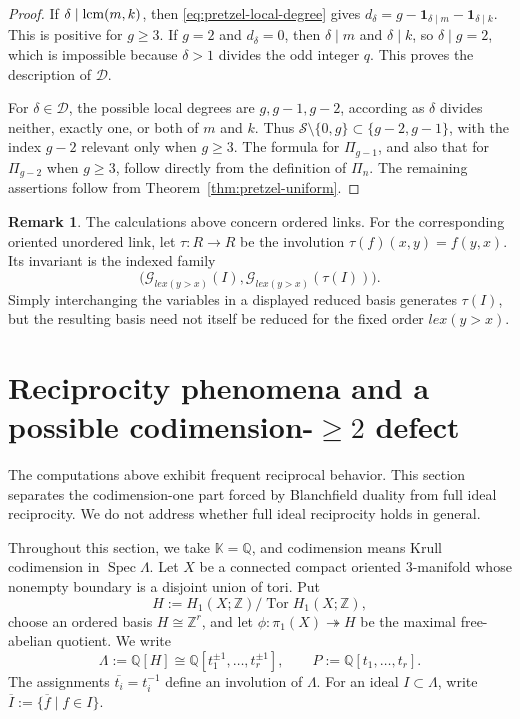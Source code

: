 \documentclass{article}
\theoremstyle{definition}
\newtheorem{remark}[definition]{Remark}
\theoremstyle{plain}
\newcommand{\Q}{{\mathbb{Q}}}
\newcommand{\lcm}{{\rm lcm}}
\newcommand{\lex}{lex}
\newcommand{\Z}{\mathbb{Z}}
\newcommand{\K}{\mathbb{K}}
\begin{document}
\begin{proof}
If \(\delta\mid\lcm(m,k)\), then
\eqref{eq:pretzel-local-degree} gives
\(d_\delta=g-\mathbf 1_{\delta\mid m}-\mathbf 1_{\delta\mid k}\).
This is positive for \(g\ge3\).  If \(g=2\) and \(d_\delta=0\), then
\(\delta\mid m\) and \(\delta\mid k\), so \(\delta\mid g=2\), which is
impossible because \(\delta>1\) divides the odd integer \(q\).  This proves
the description of \(\mathcal D\).

For \(\delta\in\mathcal D\), the possible local degrees are
\(g,g-1,g-2\), according as
\(\delta\) divides neither, exactly one, or both of \(m\) and \(k\).
Thus \(\mathcal S\setminus\{0,g\}\subset\{g-2,g-1\}\), with the
index \(g-2\) relevant only when \(g\ge3\).  The formula for
\(\Pi_{g-1}\), and also that for
\(\Pi_{g-2}\) when \(g\ge3\), follow directly from the definition of
\(\Pi_n\).  The remaining
assertions follow from Theorem~\ref{thm:pretzel-uniform}.
\end{proof}

\begin{remark}
The calculations above concern ordered links.  For the corresponding
oriented unordered link, let \(\tau\colon R\to R\) be the involution
\(\tau(f)(x,y)=f(y,x)\).  Its invariant is the indexed family
\[
\bigl(
\mathcal G_{\lex(y>x)}(I),
\mathcal G_{\lex(y>x)}(\tau(I))
\bigr).
\]
 Simply interchanging the variables in a
displayed reduced basis generates \(\tau(I)\), but the resulting basis need
not itself be reduced for the fixed order \(\lex(y>x)\).
\end{remark}




\section{Reciprocity phenomena and a possible codimension-\(\ge2\) defect}
\label{sec:reciprocity}

The computations above exhibit frequent reciprocal behavior.  This section
separates the codimension-one part forced by Blanchfield duality from full
ideal reciprocity.
We do not address whether full ideal reciprocity holds in general.

Throughout this section, we take \(\K=\Q\), and 
codimension means Krull codimension in
\(\operatorname{Spec}\Lambda\).
Let \(X\) be a connected
compact oriented \(3\)-manifold whose nonempty boundary is a disjoint union
of tori.  Put
\[
 H:=H_1(X;\Z)/\operatorname{Tor}H_1(X;\Z),
\]
choose an ordered basis \(H\cong\Z^r\), and let
\(\phi\colon\pi_1(X)\twoheadrightarrow H\) be the maximal free-abelian
quotient.  We write
\[
 \Lambda:=\Q[H]\cong\Q[t_1^{\pm1},\dots,t_r^{\pm1}],
 \qquad
 P:=\Q[t_1,\dots,t_r].
\]
The assignments \(\overline{t_i}=t_i^{-1}\) define an involution of
\(\Lambda\).  For an ideal \(I\subset\Lambda\), write
\(\overline I:=\{\overline f\mid f\in I\}\).
\end{document}
